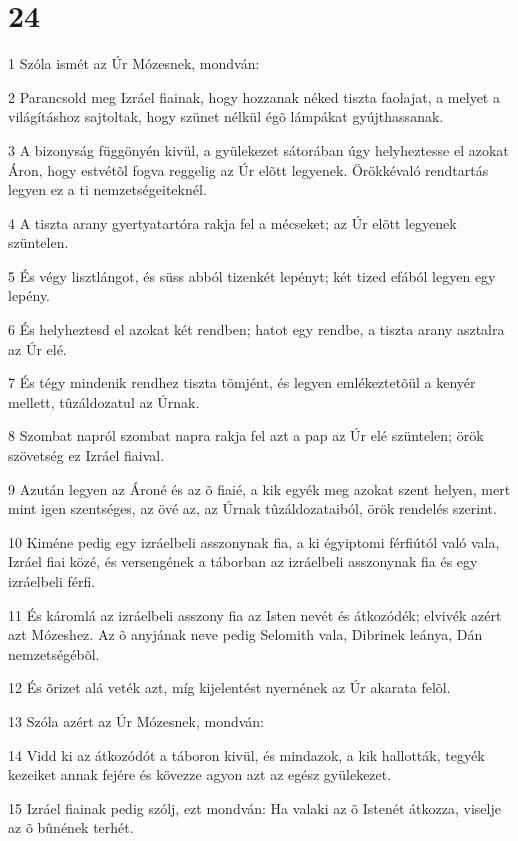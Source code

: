 \chapter{24}

\par 1 Szóla ismét az Úr Mózesnek, mondván:
\par 2 Parancsold meg Izráel fiainak, hogy hozzanak néked tiszta faolajat, a melyet a világításhoz sajtoltak, hogy szünet nélkül égõ lámpákat gyújthassanak.
\par 3 A bizonyság függönyén kivül, a gyülekezet sátorában úgy helyheztesse el azokat Áron, hogy estvétõl fogva reggelig az Úr elõtt legyenek. Örökkévaló rendtartás legyen ez a ti nemzetségeiteknél.
\par 4 A tiszta arany gyertyatartóra rakja fel a mécseket; az Úr elõtt legyenek szüntelen.
\par 5 És végy lisztlángot, és süss abból tizenkét lepényt; két tized efából legyen egy lepény.
\par 6 És helyheztesd el azokat két rendben; hatot egy rendbe, a tiszta arany asztalra az Úr elé.
\par 7 És tégy mindenik rendhez tiszta tömjént, és legyen emlékeztetõül a kenyér mellett, tûzáldozatul az Úrnak.
\par 8 Szombat napról szombat napra rakja fel azt a pap az Úr elé szüntelen; örök szövetség ez Izráel fiaival.
\par 9 Azután legyen az Ároné és az õ fiaié, a kik egyék meg azokat szent helyen, mert mint igen szentséges, az övé az, az Úrnak tûzáldozataiból, örök rendelés szerint.
\par 10 Kiméne pedig egy izráelbeli asszonynak fia, a ki égyiptomi férfiútól való vala, Izráel fiai közé, és versengének a táborban az izráelbeli asszonynak fia és egy izráelbeli férfi.
\par 11 És káromlá az izráelbeli asszony fia az Isten nevét és átkozódék; elvivék azért azt Mózeshez. Az õ anyjának neve pedig Selomith vala, Dibrinek leánya, Dán nemzetségébõl.
\par 12 És õrizet alá veték azt, míg kijelentést nyernének az Úr akarata felõl.
\par 13 Szóla azért az Úr Mózesnek, mondván:
\par 14 Vidd ki az átkozódót a táboron kivül, és mindazok, a kik hallották, tegyék kezeiket annak fejére és kövezze agyon azt az egész gyülekezet.
\par 15 Izráel fiainak pedig szólj, ezt mondván: Ha valaki az õ Istenét átkozza, viselje az õ bûnének terhét.
